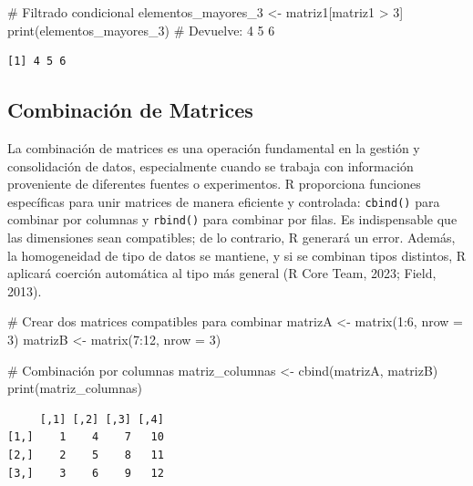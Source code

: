 \documentclass[
  spanish,
  a4paper,
  DIV=11,
  numbers=noendperiod,
  onepage,
  openany]{scrreprt}
\newenvironment{Shaded}{\begin{snugshade}}{\end{snugshade}}
\newcommand{\AttributeTok}[1]{\textcolor[rgb]{0.40,0.45,0.13}{#1}}
\newcommand{\CommentTok}[1]{\textcolor[rgb]{0.37,0.37,0.37}{#1}}
\newcommand{\DecValTok}[1]{\textcolor[rgb]{0.68,0.00,0.00}{#1}}
\newcommand{\FunctionTok}[1]{\textcolor[rgb]{0.28,0.35,0.67}{#1}}
\newcommand{\NormalTok}[1]{\textcolor[rgb]{0.00,0.23,0.31}{#1}}
\newcommand{\OtherTok}[1]{\textcolor[rgb]{0.00,0.23,0.31}{#1}}
\newcommand{\SpecialCharTok}[1]{\textcolor[rgb]{0.37,0.37,0.37}{#1}}
\begin{document}
\begin{Shaded}
\begin{Highlighting}[]
\CommentTok{\# Filtrado condicional}
\NormalTok{elementos\_mayores\_3 }\OtherTok{\textless{}{-}}\NormalTok{ matriz1[matriz1 }\SpecialCharTok{\textgreater{}} \DecValTok{3}\NormalTok{]}
\FunctionTok{print}\NormalTok{(elementos\_mayores\_3)  }\CommentTok{\# Devuelve: 4 5 6}
\end{Highlighting}
\end{Shaded}

\begin{verbatim}
[1] 4 5 6
\end{verbatim}

\subsection{Combinación de Matrices}\label{combinaciuxf3n-de-matrices}

La combinación de matrices es una operación fundamental en la gestión y
consolidación de datos, especialmente cuando se trabaja con información
proveniente de diferentes fuentes o experimentos. R proporciona
funciones específicas para unir matrices de manera eficiente y
controlada: \texttt{cbind()} para combinar por columnas y
\texttt{rbind()} para combinar por filas. Es indispensable que las
dimensiones sean compatibles; de lo contrario, R generará un error.
Además, la homogeneidad de tipo de datos se mantiene, y si se combinan
tipos distintos, R aplicará coerción automática al tipo más general (R
Core Team, 2023; Field, 2013).

\begin{Shaded}
\begin{Highlighting}[]
\CommentTok{\# Crear dos matrices compatibles para combinar}
\NormalTok{matrizA }\OtherTok{\textless{}{-}} \FunctionTok{matrix}\NormalTok{(}\DecValTok{1}\SpecialCharTok{:}\DecValTok{6}\NormalTok{, }\AttributeTok{nrow =} \DecValTok{3}\NormalTok{)}
\NormalTok{matrizB }\OtherTok{\textless{}{-}} \FunctionTok{matrix}\NormalTok{(}\DecValTok{7}\SpecialCharTok{:}\DecValTok{12}\NormalTok{, }\AttributeTok{nrow =} \DecValTok{3}\NormalTok{)}

\CommentTok{\# Combinación por columnas}
\NormalTok{matriz\_columnas }\OtherTok{\textless{}{-}} \FunctionTok{cbind}\NormalTok{(matrizA, matrizB)}
\FunctionTok{print}\NormalTok{(matriz\_columnas)}
\end{Highlighting}
\end{Shaded}

\begin{verbatim}
     [,1] [,2] [,3] [,4]
[1,]    1    4    7   10
[2,]    2    5    8   11
[3,]    3    6    9   12
\end{verbatim}
\end{document}

